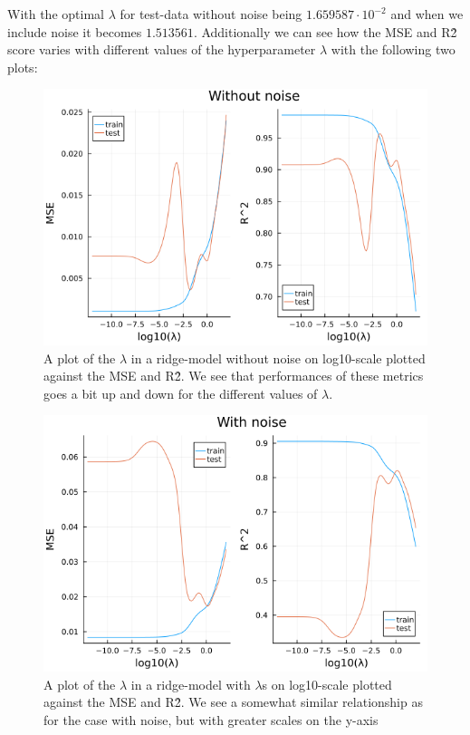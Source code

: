\documentclass{article}
\begin{document}
With the optimal $\lambda$ for test-data without noise being $1.659587\cdot
    10^{-2}$ and when we include noise it becomes $1.513561$.
Additionally we can see how the MSE and R\^2 score varies with different values
of the hyperparameter $\lambda$ with the following two plots:\\

\begin{figure}[!htb]
    \centerline{\includegraphics[scale=0.5]{ridge_without_noise}}
    \caption{A plot of the $\lambda$ in a ridge-model without noise on log10-scale plotted against the MSE and R\^2. We see that performances of these metrics goes a bit up and down for the different values of $\lambda$.}
    \label{Ridge-with-noise}
\end{figure}

\begin{figure}[!htb]
    \centerline{\includegraphics[scale=0.5]{ridge_with_noise}}
    \caption{A plot of the $\lambda$ in a ridge-model with $\lambda$s on log10-scale plotted against the MSE and R\^2. We see a somewhat similar relationship as for the case with noise, but with greater scales on the y-axis}
    \label{Ridge-no-noise}
\end{figure}
\end{document}
